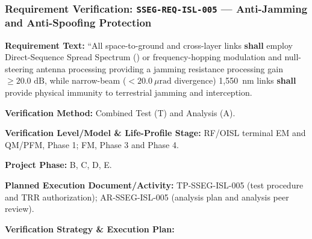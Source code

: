 \subsubsection{Requirement Verification: \texttt{SSEG-REQ-ISL-005} --- Anti-Jamming and Anti-Spoofing Protection}
\label{ver:SSEG-REQ-ISL-005}
\textbf{Requirement Text:} ``All  space-to-ground and cross-layer links \textbf{shall} employ Direct-Sequence Spread Spectrum () or frequency-hopping modulation and null-steering antenna processing providing a jamming resistance processing gain $\ge 20.0\text{ dB}$, while narrow-beam ($< 20.0~\mu\mathrm{rad}$ divergence) 1,550~nm  links \textbf{shall} provide physical immunity to terrestrial  jamming and interception.
\par\textbf{Verification Method:} Combined Test (T) and Analysis (A).
\par\textbf{Verification Level/Model \& Life-Profile Stage:} RF/OISL terminal EM and QM/PFM, Phase 1; FM, Phase 3 and Phase 4.
\par\textbf{Project Phase:} B, C, D, E.
\par\textbf{Planned Execution Document/Activity:} TP-SSEG-ISL-005 (test procedure and TRR authorization); AR-SSEG-ISL-005 (analysis plan and analysis peer review).
\par\textbf{Verification Strategy \& Execution Plan:}
